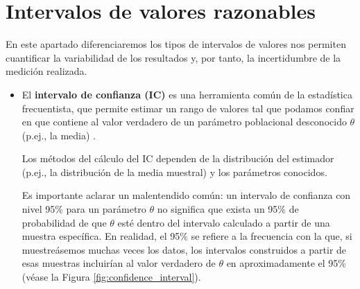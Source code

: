 \chapter{Intervalos de valores razonables}

En este apartado diferenciaremos los tipos de intervalos de valores nos permiten cuantificar la variabilidad de los resultados y, por tanto, la incertidumbre de la medición realizada. 

\begin{itemize}

    \item El \textbf{intervalo de confianza (IC)} es una herramienta común de la estadística frecuentista, que permite estimar un rango de valores tal que podamos confiar en que contiene al valor verdadero de un parámetro poblacional desconocido $\theta$ (p.ej., la media) \cite{berrendero2025}.

    Los métodos del cálculo del IC dependen de la distribución del estimador (p.ej., la distribución de la
    media muestral) y los parámetros conocidos. 

    Es importante aclarar un malentendido común: un intervalo de confianza con nivel 95\% para un parámetro $\theta$ no significa que exista un 95\% de probabilidad de que $\theta$ esté dentro del intervalo calculado a partir de una muestra específica. En realidad, el 95\% se refiere a la frecuencia con la que, si muestreásemos muchas veces los datos, los intervalos construidos a partir de esas muestras incluirían al valor verdadero de $\theta$ en aproximadamente el 95\% \cite{murphy2022} (véase la Figura \ref{fig:confidence_interval}).


\end{itemize}
